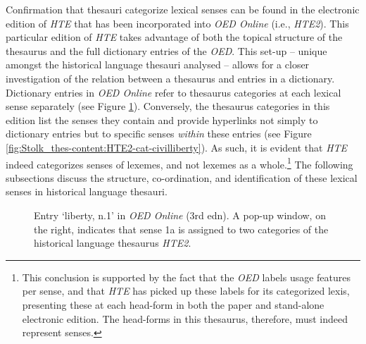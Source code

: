 Confirmation that thesauri categorize lexical senses can be found in the electronic edition of \textit{HTE} that has been incorporated into \textit{OED Online} (i.e., \textit{HTE2}). This particular edition of \textit{HTE} takes advantage of both the topical structure of the thesaurus and the full dictionary entries of the \textit{OED}. This set-up -- unique amongst the historical language thesauri analysed -- allows for a closer investigation of the relation between a thesaurus and entries in a dictionary. Dictionary entries in \textit{OED Online} refer to thesaurus categories at each lexical sense separately (see Figure \ref{fig:Stolk_thes-content:OED-sv-liberty-n1}). Conversely, the thesaurus categories in this edition list the senses they contain and provide hyperlinks not simply to dictionary entries but to specific senses \textit{within} these entries (see Figure \ref{fig:Stolk_thes-content:HTE2-cat-civilliberty}). As such, it is evident that \textit{HTE} indeed categorizes senses of lexemes, and not lexemes as a whole.\footnote{This conclusion is supported by the fact that the \textit{OED} labels usage features per sense, and that \textit{HTE} has picked up these labels for its categorized lexis, presenting these at each head-form in both the paper and stand-alone electronic edition. The head-forms in this thesaurus, therefore, must indeed represent senses.} The following subsections discuss the structure, co-ordination, and identification of these lexical senses in historical language thesauri.




\begin{figure}[htb]
    \centering
	\caption[]{\label{fig:Stolk_thes-content:OED-sv-liberty-n1} Entry `liberty, n.1' in \textit{OED Online} (3rd edn). A pop-up window, on the right, indicates that sense 1a is assigned to two categories of the historical language thesaurus \textit{HTE2}.}
\end{figure} 

